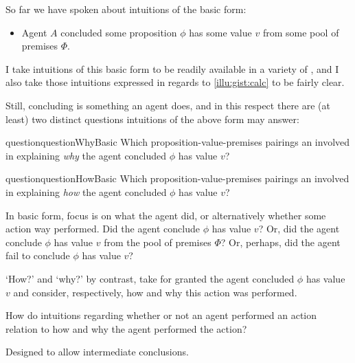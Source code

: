 \begin{note}
  So far we have spoken about intuitions of the basic form:

  \begin{itemize}
  \item
    Agent \(A\) concluded some proposition \(\phi\) has some value \(v\) from some pool of premises \(\Phi\).
  \end{itemize}

  I take intuitions of this basic form to be readily available in a variety of , and I also take those intuitions expressed in regards to \autoref{illu:gist:calc} to be fairly clear.

  Still, concluding is something an agent does, and in this respect there are (at least) two distinct questions intuitions of the above form may answer:%

  \begin{restatable}[\qWhy{}]{question}{questionWhyBasic}
    \label{q:why}
    Which proposition-value-premises pairings an involved in explaining \emph{why} the agent concluded \(\phi\) has value \(v\)?
  \end{restatable}

  \begin{restatable}[\qHow{}]{question}{questionHowBasic}
    \label{q:how}
    Which proposition-value-premises pairings an involved in explaining \emph{how} the agent concluded \(\phi\) has value \(v\)?
  \end{restatable}

  In basic form, focus is on what the agent did, or alternatively whether some action way performed.
  Did the agent conclude \(\phi\) has value \(v\)?
  Or, did the agent conclude \(\phi\) has value \(v\) from the pool of premises \(\Phi\)?
  Or, perhaps, did the agent fail to conclude \(\phi\) has value \(v\)?

  `How?' and `why?' by contrast, take for granted the agent concluded \(\phi\) has value \(v\) and consider, respectively, how and why this action was performed.

  How do intuitions regarding whether or not an agent performed an action relation to how and why the agent performed the action?
\end{note}

\begin{note}
  \color{red}
  Designed to allow intermediate conclusions.
\end{note}


